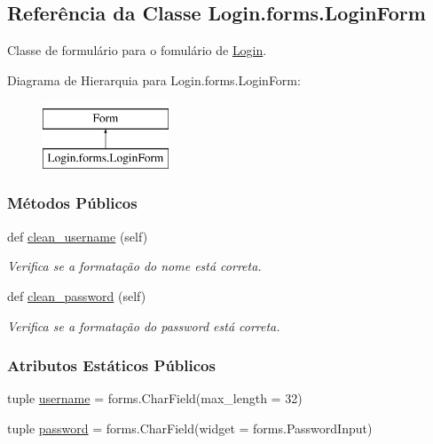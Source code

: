 \hypertarget{classLogin_1_1forms_1_1LoginForm}{}\subsection{Referência da Classe Login.\+forms.\+Login\+Form}
\label{classLogin_1_1forms_1_1LoginForm}


Classe de formulário para o fomulário de \hyperlink{namespaceLogin}{Login}.  


Diagrama de Hierarquia para Login.\+forms.\+Login\+Form\+:\begin{figure}[H]
\begin{center}
\leavevmode
\includegraphics[height=2.000000cm]{d0/db9/classLogin_1_1forms_1_1LoginForm}
\end{center}
\end{figure}
\subsubsection*{Métodos Públicos}
\begin{DoxyCompactItemize}
\item 
def \hyperlink{classLogin_1_1forms_1_1LoginForm_a23e2651502381fa3a98d416fbb1a0527}{clean\+\_\+username} (self)
\begin{DoxyCompactList}\small\item\em Verifica se a formatação do nome está correta. \end{DoxyCompactList}\item 
def \hyperlink{classLogin_1_1forms_1_1LoginForm_ab3bf974521ccb331a02ca80ff62c8794}{clean\+\_\+password} (self)
\begin{DoxyCompactList}\small\item\em Verifica se a formatação do password está correta. \end{DoxyCompactList}\end{DoxyCompactItemize}
\subsubsection*{Atributos Estáticos Públicos}
\begin{DoxyCompactItemize}
\item 
tuple \hyperlink{classLogin_1_1forms_1_1LoginForm_af3766bb4ea8cabdf57ad77214b7545fd}{username} = forms.\+Char\+Field(max\+\_\+length = 32)
\item 
tuple \hyperlink{classLogin_1_1forms_1_1LoginForm_a23e321f790e9c7bfc3e9abf767826a2d}{password} = forms.\+Char\+Field(widget = forms.\+Password\+Input)
\end{DoxyCompactItemize}


